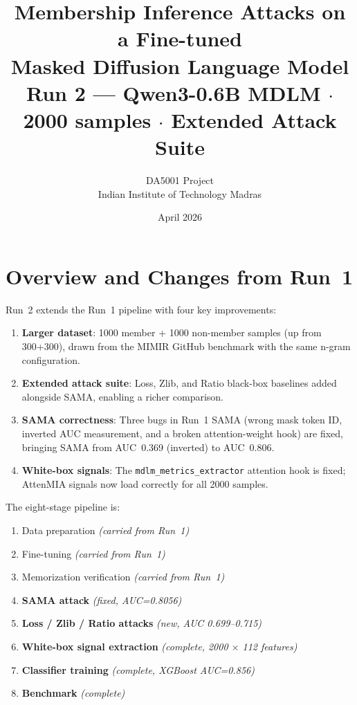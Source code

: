 \documentclass[11pt,a4paper]{article}
\title{\textbf{Membership Inference Attacks on a Fine-tuned\\
Masked Diffusion Language Model}\\[0.5em]
\large Run 2 --- Qwen3-0.6B MDLM $\cdot$ 2000 samples $\cdot$ Extended Attack Suite}
\author{DA5001 Project\\
Indian Institute of Technology Madras}
\date{April 2026}
\begin{document}
\maketitle
\tableofcontents
\newpage

\section{Overview and Changes from Run~1}

Run~2 extends the Run~1 pipeline with four key improvements:

\begin{enumerate}
  \item \textbf{Larger dataset}: 1000 member + 1000 non-member samples (up from 300+300),
        drawn from the MIMIR GitHub benchmark with the same n-gram configuration.
  \item \textbf{Extended attack suite}: Loss, Zlib, and Ratio black-box baselines added
        alongside SAMA, enabling a richer comparison.
  \item \textbf{SAMA correctness}: Three bugs in Run~1 SAMA (wrong mask token ID, inverted AUC
        measurement, and a broken attention-weight hook) are fixed, bringing SAMA from
        AUC~0.369 (inverted) to AUC~0.806.
  \item \textbf{White-box signals}: The \texttt{mdlm\_metrics\_extractor} attention hook
        is fixed; AttenMIA signals now load correctly for all 2000 samples.
\end{enumerate}

The eight-stage pipeline is:
\begin{enumerate}[label=\arabic*.]
  \item Data preparation \hfill \textit{(carried from Run~1)}
  \item Fine-tuning \hfill \textit{(carried from Run~1)}
  \item Memorization verification \hfill \textit{(carried from Run~1)}
  \item \textbf{SAMA attack} \hfill \textit{(fixed, AUC=0.8056)}
  \item \textbf{Loss / Zlib / Ratio attacks} \hfill \textit{(new, AUC 0.699--0.715)}
  \item \textbf{White-box signal extraction} \hfill \textit{(complete, 2000 $\times$ 112 features)}
  \item \textbf{Classifier training} \hfill \textit{(complete, XGBoost AUC=0.856)}
  \item \textbf{Benchmark} \hfill \textit{(complete)}
\end{enumerate}
\end{document}
